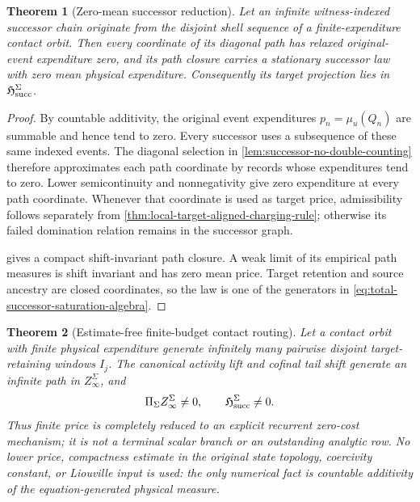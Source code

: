 \documentclass[11pt]{article}
\numberwithin{section}{part}
\theoremstyle{plain}
\newtheorem{theorem}{Theorem}[section]
\theoremstyle{definition}
\theoremstyle{remark}
\begin{document}
\begin{theorem}[Zero-mean successor reduction]
\label{thm:zero-mean-successor-reduction}
Let an infinite witness-indexed successor chain originate from the disjoint
shell sequence of a finite-expenditure contact orbit.  Then every coordinate
of its diagonal path has relaxed original-event expenditure zero, and its path
closure carries a stationary successor law with zero mean physical
expenditure.  Consequently its target projection lies in
\(\mathfrak H_{\rm succ}^{\Sigma}\).
\end{theorem}

\begin{proof}
By countable additivity, the original event expenditures
\(p_n=\mu_u(Q_n)\) are summable and hence tend to zero.  Every successor uses a
subsequence of these same indexed events.  The diagonal selection in
\cref{lem:successor-no-double-counting} therefore approximates each path
coordinate by records whose expenditures tend to zero.  Lower semicontinuity
and nonnegativity give zero expenditure at every path coordinate.  Whenever
that coordinate is used as target price, admissibility follows separately
from \cref{thm:local-target-aligned-charging-rule}; otherwise its failed
domination relation remains in the successor graph.

 gives a compact shift-invariant path
closure.  A weak limit of its empirical path measures is shift invariant and
has zero mean price.  Target retention and source ancestry are closed
coordinates, so the law is one of the generators in
\eqref{eq:total-successor-saturation-algebra}.
\end{proof}

\begin{theorem}[Estimate-free finite-budget contact routing]
\label{thm:finite-price-saturation-route}
Let a contact orbit with finite physical expenditure generate infinitely many
pairwise disjoint target-retaining windows \(I_j\).  The canonical activity
lift and cofinal tail shift generate an infinite path in
\(Z_\infty^\Sigma\), and
\begin{equation}
 \label{eq:finite-price-to-fixed-point}
 \Pi_\Sigma Z_\infty^\Sigma\ne0,
 \qquad
 \mathfrak H_{\rm succ}^{\Sigma}\ne0.
\end{equation}
Thus finite price is completely reduced to an explicit recurrent zero-cost
mechanism; it is not a terminal scalar branch or an outstanding analytic row.
No lower price, compactness estimate in the original state topology,
coercivity constant, or Liouville input is used: the only numerical fact is
countable additivity of the equation-generated physical measure.
\end{theorem}
\end{document}
